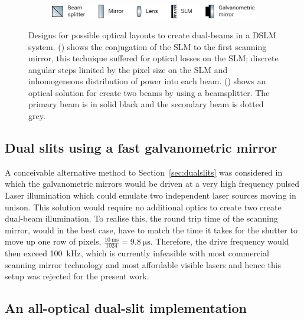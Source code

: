 \begin{figure}
    \vspace{\abovecaptionskip}
    \begin{subfigure}[t]{\textwidth}
        \centering
         \includegraphics{dual_beam_layout/key}
    \end{subfigure}
    \caption[Designs for each optical layout to create dual-beams in a light sheet system]{
    Designs for possible optical layouts to create dual-beams in a \gls{DSLM} system.
    () shows the conjugation of the \gls{SLM} to the first scanning mirror, this technique suffered for optical losses on the \gls{SLM}; discrete angular steps limited by the pixel size on the \gls{SLM} and inhomogeneous distribution of power into each beam.
    () shows an optical solution for create two beams by using a beamsplitter.
    The primary beam is in solid black and the secondary beam is dotted grey.
    }\label{fig:dual_beam_layouts}
\end{figure}

\subsection{Dual slits using a fast galvanometric mirror}

A conceivable alternative method to Section~\ref{sec:dualslits} was considered in which
the galvanometric mirrors would be driven at a very high frequency pulsed \gls{Laser} illumination which
could emulate two independent laser sources moving in unison.
This solution would require no additional optics to create two create dual-beam illumination.
To realise this, the round trip time of the scanning mirror, would in the best case, have to match the time it takes for the shutter to move up one row of pixels, \(\frac{\SI{10}{\milli\second}}{1024}=\SI{9.8}{\micro\second}\).
Therefore, the drive frequency would then exceed \SI{100}{\kilo\hertz}, which is currently infeasible with most commercial scanning mirror technology and most affordable visible lasers and hence this setup was rejected for the present work.

\subsection{An all-optical dual-slit implementation}

